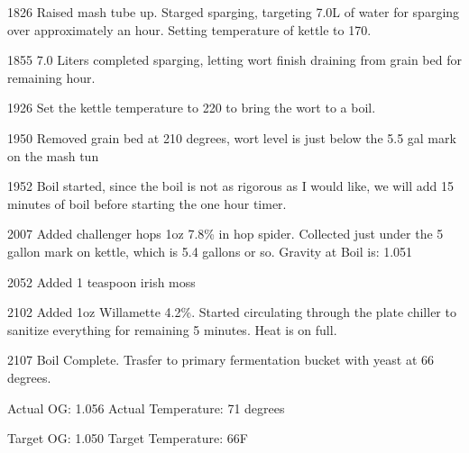1826 Raised mash tube up. Starged sparging, targeting 7.0L of water for sparging over approximately an hour.  Setting temperature of kettle to 170.

1855 7.0 Liters completed sparging, letting wort finish draining from grain bed for remaining hour.

1926 Set the kettle temperature to 220 to bring the wort to a boil.

1950 Removed grain bed at 210 degrees, wort level is just below the 5.5 gal mark on the mash tun

1952 Boil started, since the boil is not as rigorous as I would like, we will add 15 minutes of boil before starting the one hour timer.

2007 Added challenger hops 1oz 7.8\% in hop spider.  Collected just under the 5 gallon mark on kettle, which is 5.4 gallons or so.  Gravity at Boil is: 1.051

2052 Added 1 teaspoon irish moss

2102 Added 1oz Willamette 4.2\%.  Started circulating through the plate chiller to sanitize everything for remaining 5 minutes.  Heat is on full.

2107 Boil Complete.  Trasfer to primary fermentation bucket with yeast at 66 degrees.

Actual OG: 1.056
Actual Temperature: 71 degrees

Target OG: 1.050
Target Temperature: 66F
